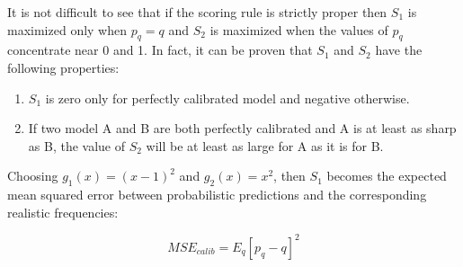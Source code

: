 It is not difficult to see that if the scoring rule is strictly proper then $S_1$ is maximized only when $p_q = q$ and $S_2$ is maximized when the values of $p_q$ concentrate near 0 and 1. In fact, it can be proven that $S_1$ and $S_2$ have the following properties: 
\begin{enumerate}
  \item $S_1$ is zero only for perfectly calibrated model and negative otherwise.
  \item If two model A and B are both perfectly calibrated and A is at least as sharp as B, the value of $S_2$ will be at least as large for A as it is for B.
\end{enumerate}

Choosing $g_1(x) = (x - 1)^2$ and $g_2(x) = x^2$, then $S_1$ becomes the expected mean squared error between probabilistic predictions and the corresponding realistic frequencies:

$$MSE_{calib} = E_{q}[p_q - q]^2$$

